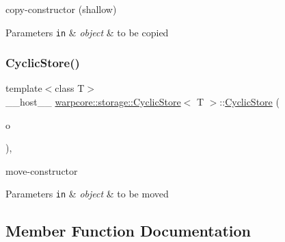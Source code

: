 copy-\/constructor (shallow) 


\begin{DoxyParams}[1]{Parameters}
\mbox{\tt in}  & {\em object} & to be copied \\
\hline
\end{DoxyParams}
\mbox{\label{classwarpcore_1_1storage_1_1CyclicStore_a5657f1b2e0f9f7c8ee0de28d2c305cf0}} 
\subsubsection{\texorpdfstring{Cyclic\+Store()}{CyclicStore()}\hspace{0.1cm}{\footnotesize\ttfamily [3/3]}}
{\footnotesize\ttfamily template$<$class T$>$ \\
\+\_\+\+\_\+host\+\_\+\+\_\+ \hyperlink{classwarpcore_1_1storage_1_1CyclicStore}{warpcore\+::storage\+::\+Cyclic\+Store}$<$ T $>$\+::\hyperlink{classwarpcore_1_1storage_1_1CyclicStore}{Cyclic\+Store} (\begin{DoxyParamCaption}\item[{\hyperlink{classwarpcore_1_1storage_1_1CyclicStore}{Cyclic\+Store}$<$ T $>$ \&\&}]{o }\end{DoxyParamCaption})\hspace{0.3cm}{\ttfamily [inline]}, {\ttfamily [noexcept]}}



move-\/constructor 


\begin{DoxyParams}[1]{Parameters}
\mbox{\tt in}  & {\em object} & to be moved \\
\hline
\end{DoxyParams}


\subsection{Member Function Documentation}
\mbox{\label{classwarpcore_1_1storage_1_1CyclicStore_ae65e099d0cfe170fc4cd2f02682c3bda}} 
